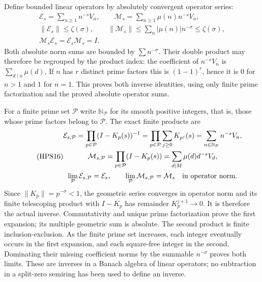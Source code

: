 Define bounded linear operators by absolutely
convergent operator series:
\begin{equation}\tag{HPS15}
\begin{gathered}
 \mathcal E_s=\sum_{n\ge1}n^{-s}V_n,\qquad
 \mathcal M_s=\sum_{n\ge1}\mu(n)n^{-s}V_n,\\
 \|\mathcal E_s\|\le\zeta(\sigma),\qquad
 \|\mathcal M_s\|\le\sum_n|\mu(n)|n^{-\sigma}
                                      \le\zeta(\sigma),\\
 \mathcal M_s\mathcal E_s=\mathcal E_s\mathcal M_s=I.
\end{gathered}
\end{equation}
Both absolute norm sums are bounded by
$\sum n^{-\sigma}$. Their double product may
therefore be regrouped by the product index:
the coefficient of $n^{-s}V_n$ is
$\sum_{d\mid n}\mu(d)$. If $n$ has $r$ distinct
prime factors this is $(1-1)^r$, hence it is
$0$ for $n>1$ and $1$ for $n=1$. This proves
both inverse identities, using only finite
prime factorization and the proved absolute
operator sums.

For a finite prime set $\mathcal P$ write
$\mathbb N_{\mathcal P}$ for its smooth positive
integers, that is, those whose prime factors
belong to $\mathcal P$. The exact finite products are
\begin{equation}\tag{HPS16}
\begin{gathered}
 \mathcal E_{s,\mathcal P}
   =\prod_{p\in\mathcal P}(I-K_p(s))^{-1}
   =\prod_{p\in\mathcal P}\sum_{j\ge0}K_{p^j}(s)
   =\sum_{n\in\mathbb N_{\mathcal P}}n^{-s}V_n,\\
 \mathcal M_{s,\mathcal P}
   =\prod_{p\in\mathcal P}(I-K_p(s))
   =\sum_{d\mid M}\mu(d)d^{-s}V_d,\\
 \lim_{\mathcal P}\mathcal E_{s,\mathcal P}
       =\mathcal E_s,\qquad
 \lim_{\mathcal P}\mathcal M_{s,\mathcal P}
       =\mathcal M_s
                           \quad\hbox{in operator norm}.
\end{gathered}
\end{equation}
Since $\|K_p\|=p^{-\sigma}<1$, the geometric
series converges in operator norm and its
finite telescoping product with $I-K_p$
has remainder $K_p^{j+1}\to0$. It is therefore
the actual inverse. Commutativity and unique
prime factorization prove the first expansion;
its multiple geometric sum is absolute.
The second product is finite inclusion-exclusion.
As the finite prime set increases, each integer
eventually occurs in the first expansion, and
each square-free integer in the second.
Dominating their missing coefficient norms by
the summable $n^{-\sigma}$ proves both limits.
These are inverses in a Banach algebra of linear
operators; no subtraction in a split-zero
semiring has been used to define an inverse.

